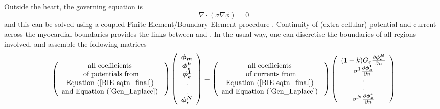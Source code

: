 Outside the
heart, the governing equation is
\begin{equation}
        \nabla \cdot (\sigma \nabla \phi )=0  
        \label{Gen_Laplace}
\end{equation}
 and this can be solved using a coupled Finite Element/Boundary Element
 procedure \cite{pullan:1996b}.  Continuity of (extra-cellular) potential and
 current across the myocardial boundaries provides the links between
  and .
In the usual way, one can discretise the boundaries of all regions involved,
and assemble the following matrices 
\begin{equation}
\left( 
\begin{array}{c}
        \text{all coefficients } \\ 
        \text{of potentials from} \\
        \text{\eqnref{BIE eqtn_final} }\\
        \text{and \eqnref{Gen_Laplace} }
\end{array}
\right) \left( 
\begin{array}{c}
        \vect{\phi _{m}}                 \\ 
        \vect{\phi _{e}^{H}} \\ 
        \vect{\phi _{e}^{1}} \\ 
        . \\ 
        . \\ 
        \vect{\phi_{e}^{\uppercase{N}}}
\end{array}
\right) =\left( 
\begin{array}{c}
        \text{all coefficients } \\ 
        \text{of currents from}  \\
        \text{\eqnref{BIE eqtn_final} } \\
        \text{and \eqnref{Gen_Laplace} }        
\end{array}
\right) \left( 
\begin{array}{c}
        (1+k)G_{e}\frac{\partial  \vect{\phi_{e}^{\uppercase{H}}}}{\partial n}  \\ 
        \sigma ^{1}\frac{\partial \vect{\phi_{e}^{1}}}{\partial n} \\ 
        . \\ 
        . \\ 
        \sigma ^{N}\frac{\partial \vect{\phi_{e}^{i}}}{\partial n}
\end{array}
\right)  
\label{global_system}
\end{equation}

